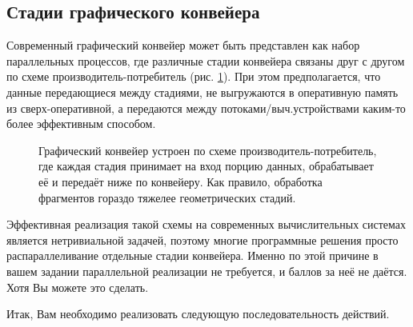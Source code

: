 \documentclass[12pt,subf,href,colorlinks=true]{article}
\begin{document}
\subsection{Стадии графического конвейера}

Современный графический конвейер может быть представлен как набор параллельных процессов, где различные стадии конвейера связаны друг с другом по схеме производитель-потребитель (рис. \ref{fig:prodcons}). При этом предполагается, что данные передающиеся между стадиями, не выгружаются в оперативную память из сверх-оперативной, а передаются между потоками/выч.устройствами каким-то более эффективным способом. 

\begin{figure}[h]
	\caption{Графический конвейер устроен по схеме производитель-потребитель, где каждая стадия принимает на вход порцию данных, обрабатывает её и передаёт ниже по конвейеру. Как правило, обработка фрагментов гораздо тяжелее геометрических стадий. }
	\label{fig:prodcons}
\end{figure}

Эффективная реализация такой схемы на современных вычислительных системах является нетривиальной задачей, поэтому многие программные решения просто распараллеливание отдельные стадии конвейера. Именно по этой причине в вашем задании параллельной реализации не требуется, и баллов за неё не даётся. Хотя Вы можете это сделать.

Итак, Вам необходимо реализовать следующую последовательность действий.
\end{document}
